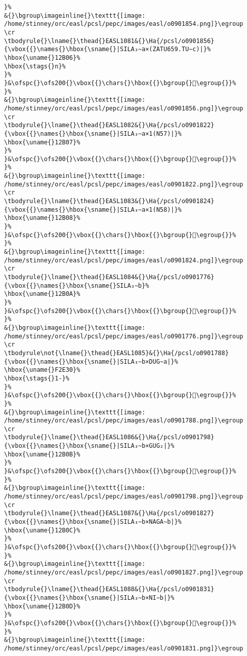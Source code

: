 \begin{verbatim}
}%
&{}\bgroup\imageinline{}\texttt{[image: /home/stinney/orc/easl/pcsl/pepc/images/easl/o0901854.png]}\egroup
\cr
\tbodyrule{}\lname{}\thead{}EASL1081&{}\Ha{/pcsl/o0901856}{\vbox{{}\names{}\hbox{\sname{}|SILA₃∼a×(ZATU659.TU∼c)|}%
\hbox{\uname{}12B06}%
\hbox{\stags{}n}%
}%
}&\ofspc{}\ofs200{}\vbox{{}\chars{}\hbox{{}\bgroup{}𒬆\egroup{}}%
}%
&{}\bgroup\imageinline{}\texttt{[image: /home/stinney/orc/easl/pcsl/pepc/images/easl/o0901856.png]}\egroup
\cr
\tbodyrule{}\lname{}\thead{}EASL1082&{}\Ha{/pcsl/o0901822}{\vbox{{}\names{}\hbox{\sname{}|SILA₃∼a×1(N57)|}%
\hbox{\uname{}12B07}%
}%
}&\ofspc{}\ofs200{}\vbox{{}\chars{}\hbox{{}\bgroup{}𒬇\egroup{}}%
}%
&{}\bgroup\imageinline{}\texttt{[image: /home/stinney/orc/easl/pcsl/pepc/images/easl/o0901822.png]}\egroup
\cr
\tbodyrule{}\lname{}\thead{}EASL1083&{}\Ha{/pcsl/o0901824}{\vbox{{}\names{}\hbox{\sname{}|SILA₃∼a×1(N58)|}%
\hbox{\uname{}12B08}%
}%
}&\ofspc{}\ofs200{}\vbox{{}\chars{}\hbox{{}\bgroup{}𒬈\egroup{}}%
}%
&{}\bgroup\imageinline{}\texttt{[image: /home/stinney/orc/easl/pcsl/pepc/images/easl/o0901824.png]}\egroup
\cr
\tbodyrule{}\lname{}\thead{}EASL1084&{}\Ha{/pcsl/o0901776}{\vbox{{}\names{}\hbox{\sname{}SILA₃∼b}%
\hbox{\uname{}12B0A}%
}%
}&\ofspc{}\ofs200{}\vbox{{}\chars{}\hbox{{}\bgroup{}𒬊\egroup{}}%
}%
&{}\bgroup\imageinline{}\texttt{[image: /home/stinney/orc/easl/pcsl/pepc/images/easl/o0901776.png]}\egroup
\cr
\tbodyrule\not{\lname{}\thead{}EASL1085}&{}\Ha{/pcsl/o0901788}{\vbox{{}\names{}\hbox{\sname{}|SILA₃∼b×DUG∼a|}%
\hbox{\uname{}F2E30}%
\hbox{\stags{}1-}%
}%
}&\ofspc{}\ofs200{}\vbox{{}\chars{}\hbox{{}\bgroup{}󲸰\egroup{}}%
}%
&{}\bgroup\imageinline{}\texttt{[image: /home/stinney/orc/easl/pcsl/pepc/images/easl/o0901788.png]}\egroup
\cr
\tbodyrule{}\lname{}\thead{}EASL1086&{}\Ha{/pcsl/o0901798}{\vbox{{}\names{}\hbox{\sname{}|SILA₃∼b×GUG₂|}%
\hbox{\uname{}12B0B}%
}%
}&\ofspc{}\ofs200{}\vbox{{}\chars{}\hbox{{}\bgroup{}𒬋\egroup{}}%
}%
&{}\bgroup\imageinline{}\texttt{[image: /home/stinney/orc/easl/pcsl/pepc/images/easl/o0901798.png]}\egroup
\cr
\tbodyrule{}\lname{}\thead{}EASL1087&{}\Ha{/pcsl/o0901827}{\vbox{{}\names{}\hbox{\sname{}|SILA₃∼b×NAGA∼b|}%
\hbox{\uname{}12B0C}%
}%
}&\ofspc{}\ofs200{}\vbox{{}\chars{}\hbox{{}\bgroup{}𒬌\egroup{}}%
}%
&{}\bgroup\imageinline{}\texttt{[image: /home/stinney/orc/easl/pcsl/pepc/images/easl/o0901827.png]}\egroup
\cr
\tbodyrule{}\lname{}\thead{}EASL1088&{}\Ha{/pcsl/o0901831}{\vbox{{}\names{}\hbox{\sname{}|SILA₃∼b×NI∼b|}%
\hbox{\uname{}12B0D}%
}%
}&\ofspc{}\ofs200{}\vbox{{}\chars{}\hbox{{}\bgroup{}𒬍\egroup{}}%
}%
&{}\bgroup\imageinline{}\texttt{[image: /home/stinney/orc/easl/pcsl/pepc/images/easl/o0901831.png]}\egroup

\end{verbatim}
